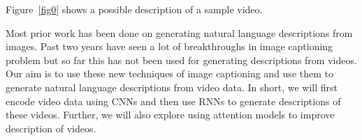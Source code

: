 \documentclass{article}
\begin{document}


		Figure~\ref{fig0} shows a possible description of a sample video.\newline

%
		Most prior work has been done on generating natural language descriptions from images. Past two years have seen a lot of breakthroughs in image captioning problem but so far this has not been used for generating descriptions from videos.\newline
		Our aim is to use these new techniques of image captioning and use them to generate natural language descriptions from video data. In short, we will first encode video data using CNNs and then use RNNs to generate descriptions of these videos. Further, we will also explore using attention models to improve description of videos.
\end{document}
